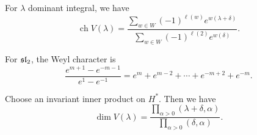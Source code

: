 \documentclass[twoside, 10pt]{article}
\begin{document}
    \begin{thm}
        For $\lambda$ dominant integral, we have
        \[ \operatorname{ch} V(\lambda) = \frac{ \sum_{w \in W} (-1)^{\ell(w)} e^{w(\lambda + \delta)} }{\sum_{w \in W} (-1)^{\ell(2)}e^{w(\delta)}}.\]
    \end{thm}

    \begin{exm}
        For $\mathfrak{sl}_2$, the Weyl character is 
        \[ \frac{e^{m+1} - e^{-m-1}}{e^1 - e^{-1}} = e^m + e^{m-2} + \cdots + e^{-m+2} + e^{-m}.\]
    \end{exm}

    \begin{thm}
        Choose an invariant inner product on $H^*$. Then we have
        \[ \dim V(\lambda) = \frac{\prod_{\alpha > 0} (\lambda + \delta, \alpha)}{\prod_{\alpha > 0} (\delta, \alpha)}.\] 
    \end{thm}
    
    
\end{document}
